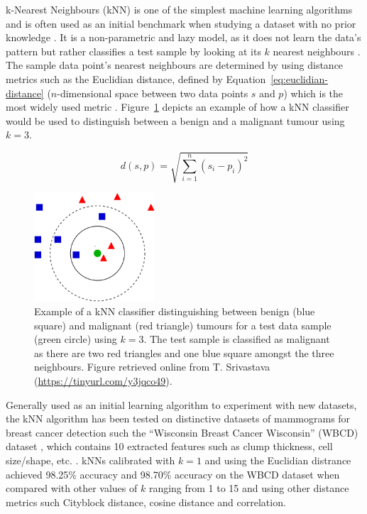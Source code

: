 k-Nearest Neighbours (kNN) is one of the simplest machine learning algorithms and is often used as an initial benchmark when studying a dataset with no prior knowledge \citep{peterson2009k}. It is a non-parametric and lazy model, as it does not learn the data's pattern but rather classifies a test sample by looking at its $k$ nearest neighbours \citep{Yue2018}. The sample data point's nearest neighbours are determined by using distance metrics such as the Euclidian distance, defined by Equation~\ref{eq:euclidian-distance} ($n$-dimensional space between two data points $s$ and $p$) which is the most widely used metric \citep{peterson2009k}. Figure~\ref{fig:litsurvey-knn-example} depicts an example of how a kNN classifier would be used to distinguish between a benign and a malignant tumour using $k=3$.

\begin{equation}
\label{eq:euclidian-distance}
    d(s,p)=\sqrt{\sum_{i=1}^{n}(s_i-p_i)^2}
\end{equation}

\begin{figure}[h]
\centerline{\includegraphics[width=0.4\textwidth]{figures/litsurvey/knn.png}}
\caption{\label{fig:litsurvey-knn-example}Example of a kNN classifier distinguishing between benign (blue square) and malignant (red triangle) tumours for a test data sample (green circle) using $k=3$. The test sample is classified as malignant as there are two red triangles and one blue square amongst the three neighbours. Figure retrieved online from T. Srivastava (\url{https://tinyurl.com/y3jqco49}).}
\end{figure}

Generally used as an initial learning algorithm to experiment with new datasets, the kNN algorithm has been tested on distinctive datasets of mammograms for breast cancer detection such the ``Wisconsin Breast Cancer Wisconsin'' (WBCD) dataset \citep{Wolberg1995}, which contains 10 extracted features such as clump thickness, cell size/shape, etc. \citep{Wolberg1995}. kNNs calibrated with $k=1$ and using the Euclidian distrance achieved 98.25\% accuracy \citep{Sarkar2000} and 98.70\% accuracy \citep{AhmedMedjahed2013} on the WBCD dataset when compared with other values of $k$ ranging from 1 to 15 and using other distance metrics such Cityblock distance, cosine distance and correlation.\\

